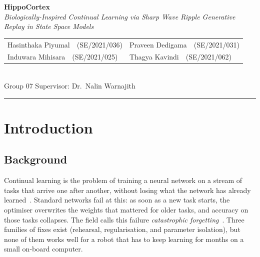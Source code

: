 \documentclass[11pt,a4paper]{article}
\renewcommand{\arraystretch}{1.0}
\begin{document}
\pagestyle{plain}

\begin{center}
{\sffamily\LARGE\bfseries HippoCortex}\\[0.2em]
{\itshape\small Biologically-Inspired Continual Learning via Sharp Wave Ripple Generative Replay in State Space Models}\\[0.7em]
{\footnotesize
\setlength{\tabcolsep}{4pt}\renewcommand{\arraystretch}{1.0}
\begin{tabular*}{0.82\linewidth}{@{\extracolsep{\fill}}ll@{}}
Hasinthaka Piyumal~~{\small(SE/2021/036)} & Praveen Dedigama~~{\small(SE/2021/031)} \\
Induwara Mihisara~~{\small(SE/2021/025)}  & Thagya Kavindi~~{\small(SE/2021/062)} \\
\end{tabular*}
}\\[0.5em]
{\footnotesize Group 07 \quad\textperiodcentered\quad Supervisor: Dr.~Nalin Warnajith}\\[0.4em]
{\color{rulegrey}\rule{\linewidth}{0.4pt}}
\end{center}

\section{Introduction}

\subsection{Background}
Continual learning is the problem of training a neural network on a stream of tasks that arrive one after another, without losing what the network has already learned~\citep{delange2022continual}. Standard networks fail at this: as soon as a new task starts, the optimiser overwrites the weights that mattered for older tasks, and accuracy on those tasks collapses. The field calls this failure \emph{catastrophic forgetting}~\citep{kirkpatrick2017overcoming}. Three families of fixes exist (rehearsal, regularisation, and parameter isolation), but none of them works well for a robot that has to keep learning for months on a small on-board computer.
\end{document}
